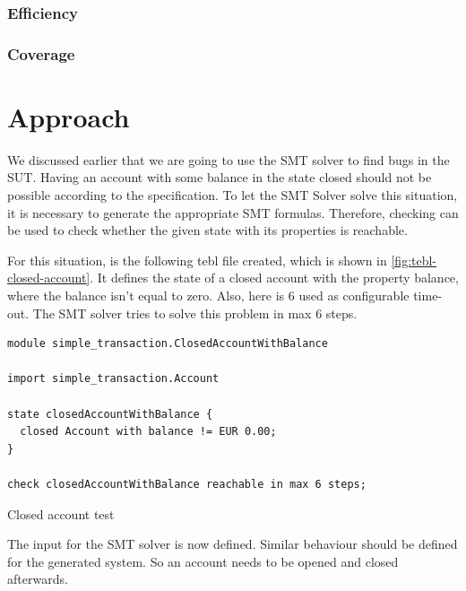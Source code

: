 \subsubsection{Efficiency}

\subsubsection{Coverage}

\section{Approach}

We discussed earlier that we are going to use the SMT solver to find bugs in the
SUT. Having an account with some balance in the state closed should not be possible
according to the specification. To let the SMT Solver solve this situation, it
is necessary to generate the appropriate SMT formulas. Therefore, checking can
be used to check whether the given state with its properties is reachable.

For this situation, is the following tebl file created, which is shown in
\autoref{fig:tebl-closed-account}. It defines the state of a closed account with
the property balance, where the balance isn't equal to zero. Also, here is 6
used as configurable time-out. The SMT solver tries to solve this problem in
max 6 steps.

\begin{sourcecode}[h!]
\begin{lstlisting}[]
module simple_transaction.ClosedAccountWithBalance

import simple_transaction.Account

state closedAccountWithBalance {
  closed Account with balance != EUR 0.00;
}

check closedAccountWithBalance reachable in max 6 steps;
\end{lstlisting}
\caption{Closed account test}\label{fig:tebl-closed-account}
\end{sourcecode}
\FloatBarrier

The input for the SMT solver is now defined. Similar behaviour should be defined
for the generated system. So an account needs to be opened and closed
afterwards.

